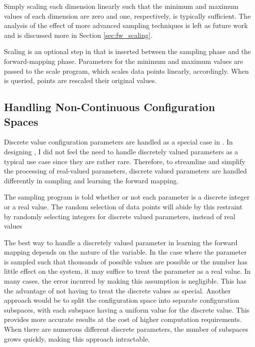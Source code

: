 Simply scaling each dimension linearly such that the minimum and maximum values of each dimension are zero and one, respectively, is typically sufficient.
The analysis of the effect of more advanced sampling techniques is left as future work and is discussed more in Section \ref{sec:fw_scaling}.


Scaling is an optional step in \fw that is inserted between the sampling phase and the forward-mapping phase.
Parameters for the minimum and maximum values are passed to the scale program, which  scales data points linearly, accordingly.
When \fw is queried, points are rescaled their original values.



\subsection{Handling Non-Continuous Configuration Spaces}

Discrete value configuration parameters are handled as a special case in \fw.
In designing \fw, I did not feel the need to handle discretely valued parameters as a typical use case since they are rather rare.
Therefore, to streamline and simplify the processing of real-valued parameters, discrete valued parameters are handled differently in sampling and learning the forward mapping.

The sampling program is told whether or not each parameter is a discrete integer or a real value.
The random selection of data points will abide by this restraint by randomly selecting integers for discrete valued parameters, instead of real values

The best way to handle a discretely valued parameter in learning the forward mapping depends on the nature of the variable.
In the case where the parameter is sampled such that thousands of possible values are possible or the number has little effect on the system, it may suffice to treat the parameter as a real value.
In many cases, the error incurred by making this assumption is negligible.
This has the advantage of not having to treat the discrete values as special.
Another approach would be to split the configuration space into separate configuration subspaces, with each subspace having a uniform value for the discrete value.
This provides more accurate results at the cost of higher computation requirements.
When there are numerous different discrete parameters, the number of subspaces grows quickly, making this approach intractable.


